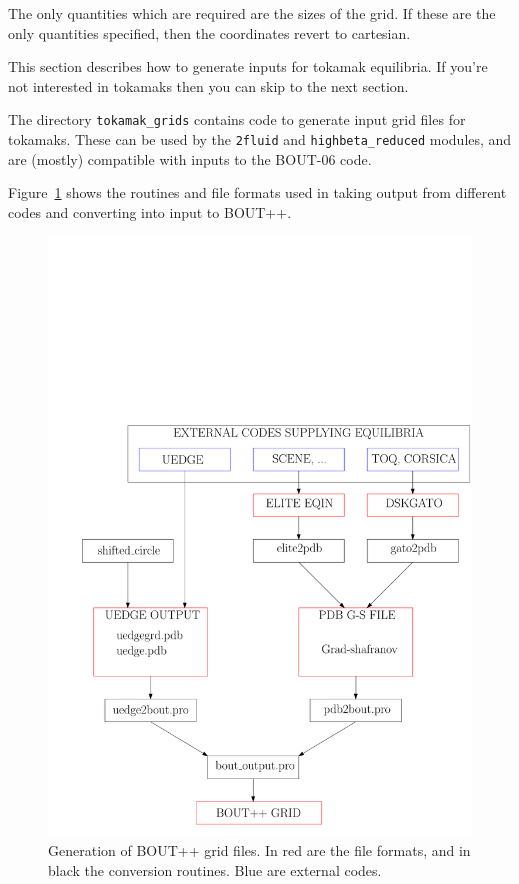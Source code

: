 \documentclass[12pt]{article}
\newcommand{\code}[1]{\texttt{#1}}
\begin{document}
The only quantities which are required are the sizes of the grid. If these are the only
quantities specified, then the coordinates revert to cartesian.


This section describes how to generate inputs for tokamak equilibria. If you're not interested
in tokamaks then you can skip to the next section.

The directory \texttt{tokamak\_grids} contains code to generate input grid files for tokamaks.
These can be used by the \code{2fluid} and \code{highbeta\_reduced} modules, and are (mostly)
compatible with inputs to the BOUT-06 code. 

Figure~\ref{fig:gridgen} shows the routines and file formats used in taking
output from different codes and converting into input to BOUT++.
\begin{figure}[htbp!]
\centering
\includegraphics[width=0.7\paperwidth, keepaspectratio]{figs/grid_gen.pdf}
\caption{Generation of BOUT++ grid files. In red are the file formats, and in black the conversion routines. Blue are external codes.}
\label{fig:gridgen}
\end{figure}
\end{document}
